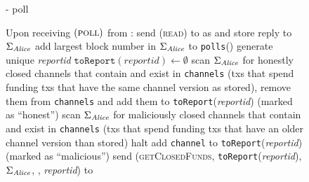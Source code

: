   \begin{figure}[H]
    \begin{systembox}{\fpaynet - poll}
      \begin{algorithmic}[1]
        \State Upon receiving $\left(\textsc{poll}\right)$ from \alice:
        \Indent
          \State send (\textsc{read}) to \ledger{} as \alice{} and store reply
          to $\Sigma_{\mathit{Alice}}$
          \label{alg:fpaynet:poll:read}
          \State add largest block number in $\Sigma_{\mathit{Alice}}$ to
          \texttt{polls}(\alice)
          \label{alg:fpaynet:poll:height}
          \State generate unique \textit{reportid}
          \label{alg:fpaynet:poll:id}
          \State $\mathtt{toReport}\left(\mathit{reportid}\right) \gets
          \emptyset$
          \State scan $\Sigma_{\mathit{Alice}}$ for honestly closed channels that
          contain \alice{} and exist in \texttt{channels} (txs that spend
          funding txs that have the same channel version as stored), remove them
          from \texttt{channels} and add them to
          \texttt{toReport}(\textit{reportid}) (marked as ``honest'')
          \State scan $\Sigma_{\mathit{Alice}}$ for maliciously closed channels that
          contain \alice{} and exist in \texttt{channels} (txs that spend
          funding txs that have an older channel version than stored)
          \label{alg:fpaynet:poll:malicious}
            \label{alg:fpaynet:poll:badevent}
              \State halt 
            \EndIf
            \State add \texttt{channel} to \texttt{toReport}(\textit{reportid})
            (marked as ``malicious'')
          \EndFor
          \State send (\textsc{getClosedFunds},
          \texttt{toReport}(\textit{reportid}), $\Sigma_{\mathit{Alice}}$, \alice,
          \textit{reportid}) to \simulator
        \EndIndent
      \end{algorithmic}
    \end{systembox}
    \caption{}
    \label{alg:fpaynet:poll}
  \end{figure}

